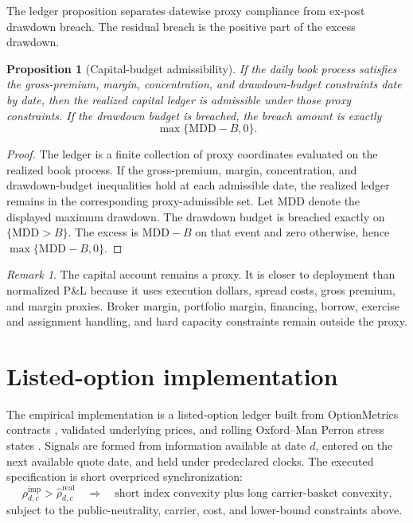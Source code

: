 \documentclass[11pt,a4paper]{amsart}
\theoremstyle{plain}
\newtheorem{proposition}[theorem]{Proposition}
\theoremstyle{definition}
\theoremstyle{remark}
\newtheorem{remark}[theorem]{Remark}
\begin{document}
The ledger proposition separates datewise proxy compliance from ex-post drawdown breach.  The
residual breach is the positive part of the excess drawdown.

\begin{proposition}[Capital-budget admissibility]\label{prop:capital-budget}
If the daily book process satisfies the gross-premium, margin, concentration, and drawdown-budget
constraints date by date, then the realized capital ledger is admissible under those proxy
constraints.  If the drawdown budget is breached, the breach amount is exactly
\[
        \max\{\mathrm{MDD}-B,0\}.
\]
\end{proposition}

\begin{proof}
The ledger is a finite collection of proxy coordinates evaluated on the realized book process.  If
the gross-premium, margin, concentration, and drawdown-budget inequalities hold at each admissible
date, the realized ledger remains in the corresponding proxy-admissible set.  Let \(\mathrm{MDD}\)
denote the displayed maximum drawdown.  The drawdown budget is breached exactly on
\(\{\mathrm{MDD}>B\}\).  The excess is \(\mathrm{MDD}-B\) on that event and zero otherwise, hence
\(\max\{\mathrm{MDD}-B,0\}\).
\end{proof}

\begin{remark}
The capital account remains a proxy.  It is closer to deployment than normalized P\&L because it uses
execution dollars, spread costs, gross premium, and margin proxies.  Broker margin, portfolio margin,
financing, borrow, exercise and assignment handling, and hard capacity constraints remain outside
the proxy.
\end{remark}

\section{Listed-option implementation}\label{sec:empirical}

The empirical implementation is a listed-option ledger built from OptionMetrics contracts
\cite{optionMetricsIvydbUs}, validated underlying prices, and rolling Oxford--Man Perron stress
states \cite{lundeShephardSheppard2010}.  Signals are formed from information available at date
\(d\), entered on the next available quote date, and held under predeclared clocks.  The executed
specification is short overpriced synchronization:
\[
        \rho^{\mathrm{imp}}_{d,c}>\widehat\rho^{\mathrm{real}}_{d,c}
        \quad\Rightarrow\quad
        \text{short index convexity plus long carrier-basket convexity,}
\]
subject to the public-neutrality, carrier, cost, and lower-bound constraints above.
\end{document}
